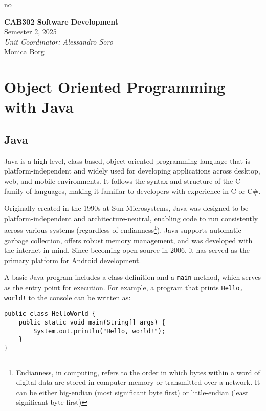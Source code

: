 no\documentclass{article}
\date{}
\newcommand{\codecmd}[1]{\textcolor[rgb]{0,0.5,0}{\texttt{#1}}}
\newcommand{\unitName}{CAB302 Software Development}
\newcommand{\unitTime}{Semester 2, 2025}
\newcommand{\unitCoordinator}{Unit Coordinator: Alessandro Soro}
\newcommand{\documentAuthors}{Monica Borg}
\begin{document}
%
\begin{titlepage}
    \vspace*{\fill}
    \begin{center}
        \LARGE{\textbf{\unitName}} \\[0.1in]
        \normalsize{\unitTime} \\[0.2in]
        \normalsize\textit{\unitCoordinator} \\[0.2in]
        \documentAuthors
    \end{center}
    \vspace*{\fill}
    \thispagestyle{empty}
\end{titlepage}
\newpage
%
\tableofcontents
\newpage
%
\section{Object Oriented Programming with Java}

\subsection{Java}
Java is a high-level, class-based, object-oriented programming language that is platform-independent and widely used for developing applications across desktop, web, and mobile environments. It follows the syntax and structure of the C-family of languages, making it familiar to developers with experience in C or C\#.

Originally created in the 1990s at Sun Microsystems, Java was designed to be platform-independent and architecture-neutral, enabling code to run consistently across various systems (regardless of endianness\footnote{Endianness, in computing, refers to the order in which bytes within a word of digital data are stored in computer memory or transmitted over a network. It can be either big-endian (most significant byte first) or little-endian (least significant byte first)}). Java supports automatic garbage collection, offers robust memory management, and was developed with the internet in mind. Since becoming open source in 2006, it has served as the primary platform for Android development.

A basic Java program includes a class definition and a \codecmd{main} method, which serves as the entry point for execution. For example, a program that prints \codecmd{Hello, world!} to the console can be written as:

\begin{verbatim}
public class HelloWorld {
    public static void main(String[] args) {
        System.out.println("Hello, world!");
    }
}
\end{verbatim}
\end{document}
